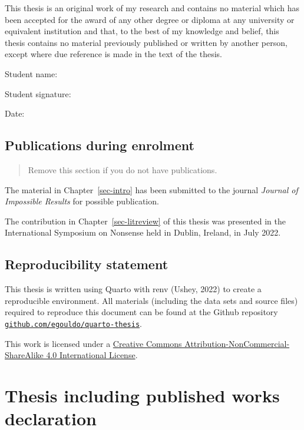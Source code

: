 \documentclass{uniexeterthesis}
\begin{document}

This thesis is an original work of my research and contains no material
which has been accepted for the award of any other degree or diploma at
any university or equivalent institution and that, to the best of my
knowledge and belief, this thesis contains no material previously
published or written by another person, except where due reference is
made in the text of the thesis.

Student name:

Student signature:

Date:

\hypertarget{publications-during-enrolment}{%
\subsection*{Publications during
enrolment}\label{publications-during-enrolment}}

\begin{quote}
Remove this section if you do not have publications.
\end{quote}

The material in Chapter~\ref{sec-intro} has been submitted to the
journal \emph{Journal of Impossible Results} for possible publication.

The contribution in Chapter~\ref{sec-litreview} of this thesis was
presented in the International Symposium on Nonsense held in Dublin,
Ireland, in July 2022.

\hypertarget{reproducibility-statement}{%
\subsection*{Reproducibility
statement}\label{reproducibility-statement}}

This thesis is written using Quarto with renv (Ushey, 2022) to create a
reproducible environment. All materials (including the data sets and
source files) required to reproduce this document can be found at the
Github repository
\href{https://github.com/egouldo/quarto-thesis}{\texttt{github.com/egouldo/quarto-thesis}}.

This work is licensed under a
\href{http://creativecommons.org/licenses/by-nc-sa/4.0/}{Creative
Commons Attribution-NonCommercial-ShareAlike 4.0 International License}.

\hypertarget{thesis-including-published-works-declaration}{%
\section*{Thesis including published works
declaration}\label{thesis-including-published-works-declaration}}
\end{document}
